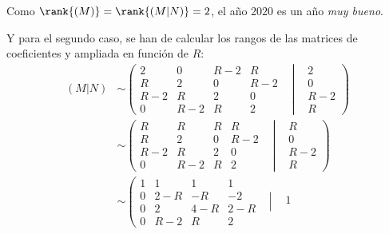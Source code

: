 \documentclass[../../main.tex]{subfiles}
\begin{document}
  Como $\rank{(M)} = \rank{(M | N)} = 2$, el año $2020$ es un año \textit{muy bueno}.

  Y para el segundo caso, se han de calcular los rangos de las matrices de coeficientes y ampliada en función de $R$:
  \begin{equation*}
    \begin{split}
      (M | N) & \sim \left(
        \begin{matrix}
            2   &   0   & R - 2 &   R   & \\
            R   &   2   &   0   & R - 2 & \\
          R - 2 &   R   &   2   &   0   & \\
            0   & R - 2 &   R   &   2   &
        \end{matrix}
        \left|
          \begin{matrix}
            &   2   \\
            &   0   \\
            & R - 2 \\
            &   R
          \end{matrix}
        \right .
      \right) \\ & \sim \left(
        \begin{matrix}
            R   &   R   & R &   R   & \\
            R   &   2   & 0 & R - 2 & \\
          R - 2 &   R   & 2 &   0   & \\
            0   & R - 2 & R &   2   &
        \end{matrix}
        \left|
          \begin{matrix}
            &   R   \\
            &   0   \\
            & R - 2 \\
            &   R
          \end{matrix}
        \right .
      \right) \\ & \sim \left(
        \begin{matrix}
          1 &   1   &   1   &   1   & \\
          0 & 2 - R &  - R  &  - 2  & \\
          0 &   2   & 4 - R & 2 - R & \\
          0 & R - 2 &   R   &   2   &
        \end{matrix}
        \left|
          \begin{matrix}
            &  1  \\

\end{matrix}
\end{split}
\end{equation*}
\end{document}
